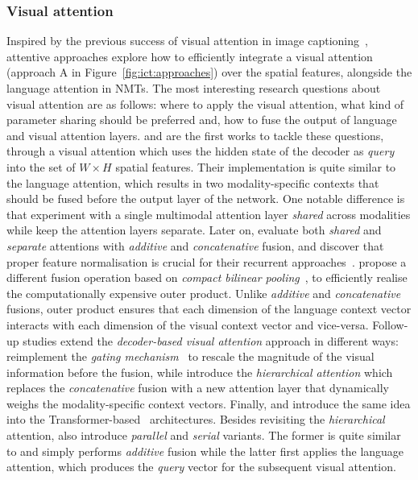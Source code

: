 \documentclass{svjour3}
\begin{document}
\subsubsection{Visual attention}
\label{sec:tasks:ict:att}
Inspired by the previous success of visual attention in image captioning~\citep{xu-show-2015}, attentive approaches explore how to efficiently integrate a visual attention (approach A in Figure~\ref{fig:ict:approaches}) over the spatial features, alongside the language attention in NMTs. The most interesting research questions about visual attention are as follows: where to apply the visual attention, what kind of parameter sharing should be preferred and, how to fuse the output of language and visual attention layers.
\cite{caglayan-does-2016} and \cite{calixto-elliott-frank:2016:WMT} are the first works to tackle these questions, through a visual attention which uses the hidden state of the decoder as \textit{query} into the set of $W\times H$ spatial features. Their implementation is quite similar to the language attention, which results in two modality-specific contexts that should be fused before the output layer of the network. One notable difference is that \cite{caglayan-does-2016} experiment with a single multimodal attention layer \textit{shared} across modalities while \cite{calixto-elliott-frank:2016:WMT} keep the attention layers separate. Later on, \cite{caglayan-multimodal-2016} evaluate both \textit{shared} and \textit{separate} attentions with \textit{additive} and \textit{concatenative} fusion, and discover that proper feature normalisation is crucial for their recurrent approaches~\citep{caglayan-EtAl:2018:WMT}.
\cite{delbrouck-bilinearpooling-2017} propose a different fusion operation based on \textit{compact bilinear pooling}~\citep{fukui-mcb-2016}, to efficiently realise the computationally expensive outer product. Unlike \textit{additive} and \textit{concatenative} fusions, outer product ensures that each dimension of the language context vector interacts with each dimension of the visual context vector and vice-versa.
Follow-up studies extend the \textit{decoder-based visual attention} approach in different ways: \citet{calixto-doubly-2017} reimplement the \textit{gating mechanism}~\citep{xu-show-2015} to rescale the magnitude of the visual information before the fusion,
while \citet{libovicky-att-2017} introduce the \textit{hierarchical attention} which replaces the \textit{concatenative} fusion with a new attention layer that dynamically weighs the modality-specific context vectors.
Finally, \citet{arslan-doubly-2018} and \citet{libovicky-tfatt-2018} introduce the same idea into the Transformer-based~\citep{vaswani-attention-2017} architectures. Besides revisiting the \textit{hierarchical} attention, \cite{libovicky-tfatt-2018} also introduce \textit{parallel} and \textit{serial} variants. The former is quite similar to \cite{arslan-doubly-2018} and simply performs \textit{additive} fusion while the latter first applies the language attention, which produces the \textit{query} vector for the subsequent visual attention.
\end{document}
